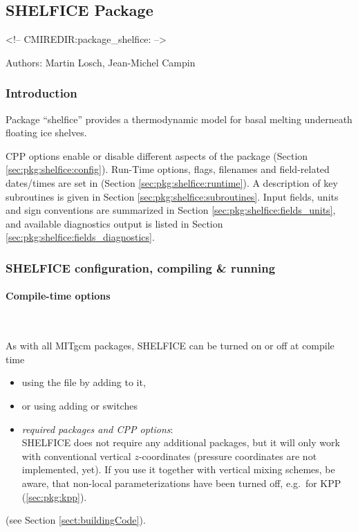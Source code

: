 
\subsection{SHELFICE Package}
\label{sec:pkg:shelfice}
\begin{rawhtml}
<!-- CMIREDIR:package_shelfice: -->
\end{rawhtml}

Authors: Martin Losch, Jean-Michel Campin

\subsubsection{Introduction
\label{sec:pkg:exf:intro}}


Package ``shelfice'' provides a thermodynamic model for basal melting
underneath floating ice shelves.

CPP options enable or disable different aspects of the package
(Section \ref{sec:pkg:shelfice:config}).
Run-Time options, flags, filenames and field-related dates/times are
set in 
(Section \ref{sec:pkg:shelfice:runtime}).
A description of key subroutines is given in Section
\ref{sec:pkg:shelfice:subroutines}.
Input fields, units and sign conventions are summarized in
Section \ref{sec:pkg:shelfice:fields_units}, and available diagnostics
output is listed in Section \ref{sec:pkg:shelfice:fields_diagnostics}.


\subsubsection{SHELFICE configuration, compiling \& running}

\paragraph{Compile-time options
\label{sec:pkg:shelfice:config}}
~

As with all MITgcm packages, SHELFICE can be turned on or off at compile time
%
\begin{itemize}
%
\item
using the  file by adding  to it,
%
\item
or using  adding
 or  switches
%
\item
\textit{required packages and CPP options}: \\
SHELFICE does not require any additional packages, but it will only
work with conventional vertical $z$-coordinates (pressure coordinates
are not implemented, yet). If you use it together with vertical mixing
schemes, be aware, that non-local parameterizations have been turned
off, e.g.\ for KPP (\ref{sec:pkg:kpp}).
%
\end{itemize}
(see Section \ref{sect:buildingCode}).

